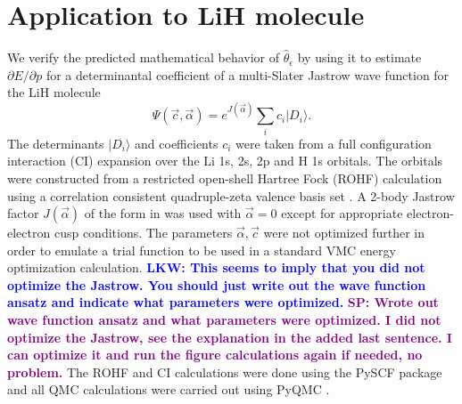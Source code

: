\documentclass[twocolumn]{revtex4-1}
\newcommand{\lucas}[1]{\textbf{\textcolor{blue}{LKW: #1}}}
\newcommand{\shivesh}[1]{\textbf{\textcolor{purple}{SP: #1}}}
\begin{document}
\section{Application to LiH molecule}
We verify the predicted mathematical behavior of $\hat{\theta}_\epsilon$ by using it to estimate $\partial E/\partial p$ for a determinantal coefficient of a multi-Slater Jastrow wave function for the LiH molecule
\begin{equation}
\Psi(\vec{c}, \vec{\alpha}) = e^{J(\vec{\alpha})} \sum_{i} c_i  |D_i \rangle.
\end{equation}
The determinants $|D_i \rangle$ and coefficients $c_i$ were taken from a full configuration interaction (CI) expansion over the Li 1s, 2s, 2p and H 1s orbitals.
The orbitals were constructed from a restricted open-shell Hartree Fock (ROHF) calculation using a correlation consistent quadruple-zeta valence basis set \cite{doi:10.1063/1.456153}.
A 2-body Jastrow factor $J(\vec{\alpha})$ of the form in \cite{Wagner2009} was used with $\vec{\alpha} = 0$ except for appropriate electron-electron cusp conditions.
The parameters $\vec{\alpha}, \vec{c}$ were not optimized further in order to emulate a trial function to be used in a standard VMC energy optimization calculation.
\lucas{This seems to imply that you did not optimize the Jastrow. You should just write out the wave function ansatz and indicate what parameters were optimized.}
\shivesh{Wrote out wave function ansatz and what parameters were optimized. I did not optimize the Jastrow, see the explanation in the added last sentence. I can optimize it and run the figure calculations again if needed, no problem.}
The ROHF and CI calculations were done using the PySCF package \cite{PYSCF} and all QMC calculations were carried out using PyQMC \cite{pyqmc}.
\end{document}
